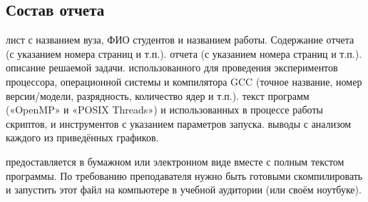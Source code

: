 { %
	\subsection{Состав отчета}
	\begin{enumerate}
		 лист с названием вуза, ФИО студентов и названием работы. Содержание отчета (с указанием номера страниц и т.п.).
		 отчета (с указанием номера страниц и т.п.).
		 описание решаемой задачи.
		 использованного для проведения экспериментов  процессора, операционной системы и компилятора GCC  (точное название, номер версии/модели, разрядность, количество ядер и т.п.).
		 текст программ («OpenMP» и «POSIX Threads») и использованных в процессе работы скриптов, и инструментов с указанием параметров запуска.
		 выводы с анализом каждого из приведённых графиков.
	\end{enumerate}
	 предоставляется в бумажном или электронном виде вместе с полным текстом программы. По требованию преподавателя нужно быть готовыми скомпилировать и запустить этот файл на компьютере в учебной аудитории (или своём ноутбуке).
	\par
}